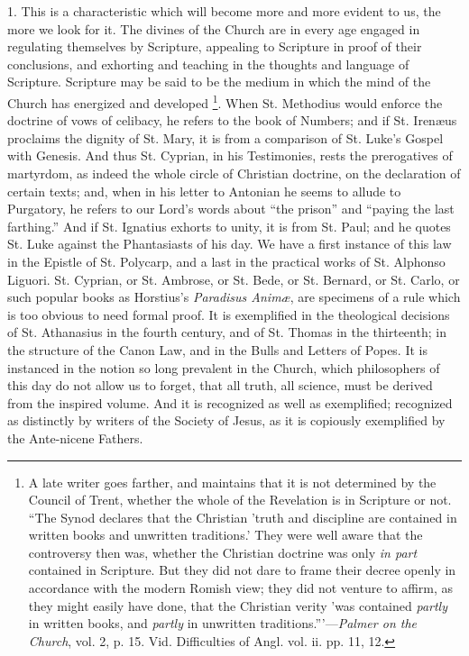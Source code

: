 1. This is a characteristic which will become more and more evident
to us, the more we look for it. The divines of the Church are in every
age engaged in regulating themselves by Scripture, appealing to
Scripture in proof of their conclusions, and exhorting and teaching in
the thoughts and language of Scripture. Scripture may be said to be
the medium in which the mind of the Church has energized and developed
\footnote{A late writer goes farther, and maintains
that it is not determined by the Council of Trent, whether the whole
of the Revelation is in Scripture or not. ``The Synod declares
that the Christian 'truth and discipline are contained in written
books and unwritten traditions.' They were well aware that the
controversy then was, whether the Christian doctrine was only \emph{in
part} contained in Scripture. But they did not dare to frame their
decree openly in accordance with the modern Romish view; they did not
venture to affirm, as they might easily have done, that the Christian
verity 'was contained \emph{partly} in written books, and \emph{partly}
in unwritten traditions.'''—\emph{Palmer on the Church}, vol. 2,
p. 15. Vid. Difficulties of Angl. vol. ii. pp. 11, 12.}. When St. Methodius
would enforce the doctrine of vows of celibacy, he refers to the book
of Numbers; and if St. Irenæus proclaims the dignity of St. Mary, it
is from a comparison of St. Luke's Gospel with Genesis. And thus St.
Cyprian, in his Testimonies, rests the prerogatives of martyrdom, as
indeed the whole circle of Christian doctrine, on the declaration of
certain texts; and, when in his letter to Antonian he seems to allude
to Purgatory, he refers to our Lord's words about ``the
prison'' and ``paying the last farthing.'' And if St.
Ignatius exhorts to unity, it is from St. Paul; and he quotes St. Luke
against the Phantasiasts of his day. We have a first instance of this
law in the Epistle of St. Polycarp, and a last in the practical works
of St. Alphonso Liguori. St. Cyprian, or St. Ambrose, or St. Bede, or
St. Bernard, or St. Carlo, or such popular books as Horstius's \emph{Paradisus
Animæ}, are specimens of a rule which is too obvious to need
formal proof. It is exemplified in the theological decisions of St.
Athanasius in the fourth century, and of St. Thomas in the thirteenth;
in the structure of the Canon Law, and in the Bulls and Letters of
Popes. It is instanced in the notion so long prevalent in the Church,
which philosophers of this day do not allow us to forget, that all
truth, all science, must be derived from the inspired volume. And it
is recognized as well as exemplified; recognized as distinctly by
writers of the Society of Jesus, as it is copiously exemplified by the
Ante-nicene Fathers.

